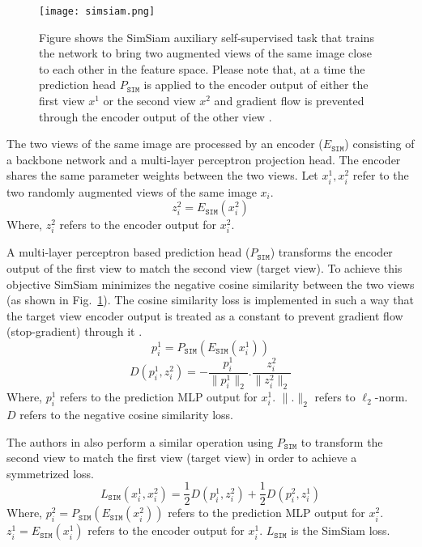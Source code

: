 \documentclass[10pt,twocolumn,letterpaper]{article}
\begin{document}
\begin{figure}[t]
\centering
    \texttt{[image: simsiam.png]}
\caption{Figure shows the SimSiam auxiliary self-supervised task that trains the network to bring two augmented views of the same image close to each other in the feature space. Please note that, at a time the prediction head $P_\texttt{SIM}$ is applied to the encoder output of either the first view $x^1$ or the second view $x^2$ and gradient flow is prevented through the encoder output of the other view \cite{chen2020exploring}.} 
\label{fig:simsiam}
\end{figure}

The two views of the same image are processed by an encoder ($E_{\texttt{SIM}}$) consisting of a backbone network and a multi-layer perceptron projection head. The encoder shares the same parameter weights between the two views. Let $x_i^1,x_i^2$ refer to the two randomly augmented views of the same image $x_i$.
\begin{equation}\label{eq:sim1}
    z_i^2 = E_{\texttt{SIM}}(x_i^2)
\end{equation}
Where, $z_i^2$ refers to the encoder output for $x_i^2$.

A multi-layer perceptron based prediction head ($P_{\texttt{SIM}}$) transforms the encoder output of the first view to match the second view (target view). To achieve this objective SimSiam minimizes the negative cosine similarity between the two views (as shown in Fig.~\ref{fig:simsiam}). The cosine similarity loss is implemented in such a way that the target view encoder output is treated as a constant to prevent gradient flow (stop-gradient) through it \cite{chen2020exploring}.
\begin{equation}\label{eq:sim2}
    p_i^1 = P_{\texttt{SIM}}(E_{\texttt{SIM}}(x_i^1))
\end{equation}
\begin{equation}\label{eq:sim3}
    D(p_i^1,z_i^2) = -\frac{p_i^1}{\|p_i^1\|_2}.\frac{z_i^2}{\|z_i^2\|_2}
\end{equation}
Where, $p_i^1$ refers to the prediction MLP output for $x_i^1$. $\|.\|_2$ refers to $\ell_2$-norm. $D$ refers to the negative cosine similarity loss.

The authors in \cite{chen2020exploring} also perform a similar operation using $P_{\texttt{SIM}}$ to transform the second view to match the first view (target view) in order to achieve a symmetrized loss.
\begin{equation}\label{eq:sim4}
    L_{\texttt{SIM}}(x_i^1,x_i^2) = \frac{1}{2}D(p_i^1,z_i^2) + \frac{1}{2}D(p_i^2,z_i^1)
\end{equation}
Where, $p_i^2 = P_{\texttt{SIM}}(E_{\texttt{SIM}}(x_i^2))$ refers to the prediction MLP output for $x_i^2$. $z_i^1 = E_{\texttt{SIM}}(x_i^1)$ refers to the encoder output for $x_i^1$. $L_{\texttt{SIM}}$ is the SimSiam loss.
\end{document}
